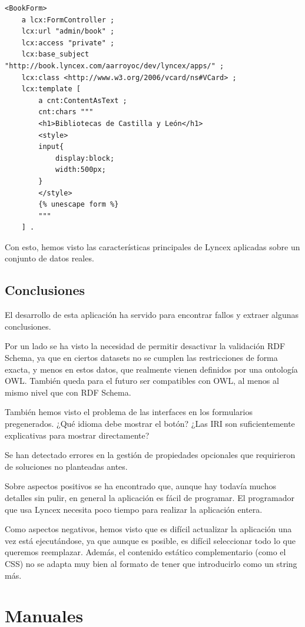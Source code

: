 \documentclass[12pt]{report} %
\begin{document}
\begin{lstlisting}
<BookForm>
    a lcx:FormController ;
    lcx:url "admin/book" ;
    lcx:access "private" ;
    lcx:base_subject "http://book.lyncex.com/aarroyoc/dev/lyncex/apps/" ;
    lcx:class <http://www.w3.org/2006/vcard/ns#VCard> ;
    lcx:template [
        a cnt:ContentAsText ;
        cnt:chars """
        <h1>Bibliotecas de Castilla y León</h1>
        <style>
        input{
            display:block;
            width:500px;
        }
        </style>
        {% unescape form %}
        """
    ] .
\end{lstlisting}

Con esto, hemos visto las características principales de Lyncex aplicadas sobre un conjunto de datos reales.

\section{Conclusiones}

El desarrollo de esta aplicación ha servido para encontrar fallos y extraer algunas conclusiones.

Por un lado se ha visto la necesidad de permitir desactivar la validación RDF Schema, ya que en ciertos datasets no se cumplen las restricciones de forma exacta, y menos en estos datos, que realmente vienen definidos por una ontología OWL. También queda para el futuro ser compatibles con OWL, al menos al mismo nivel que con RDF Schema.

También hemos visto el problema de las interfaces en los formularios pregenerados. ¿Qué idioma debe mostrar el botón? ¿Las IRI son suficientemente explicativas para mostrar directamente?

Se han detectado errores en la gestión de propiedades opcionales que requirieron de soluciones no planteadas antes.

Sobre aspectos positivos se ha encontrado que, aunque hay todavía muchos detalles sin pulir, en general la aplicación es fácil de programar. El programador que usa Lyncex necesita poco tiempo para realizar la aplicación entera. 

Como aspectos negativos, hemos visto que es difícil actualizar la aplicación una vez está ejecutándose, ya que aunque es posible, es difícil seleccionar todo lo que queremos reemplazar. Además, el contenido estático complementario (como el CSS) no se adapta muy bien al formato de tener que introducirlo como un string más.

\chapter{Manuales}
\end{document}
